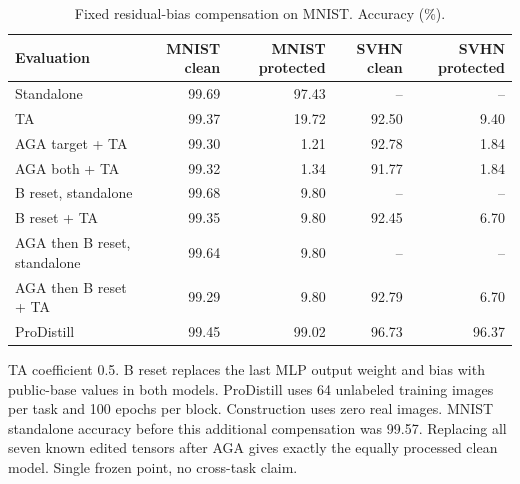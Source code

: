 \begin{table}[t]
\centering\small
\setlength{\tabcolsep}{4pt}
\caption{Fixed residual-bias compensation on MNIST. Accuracy (\%).}
\label{tab:evaluation}
\begin{tabular}{@{}lrrrr@{}}
\toprule
Evaluation & MNIST clean & MNIST protected & SVHN clean & SVHN protected \\
\midrule
Standalone & 99.69 & 97.43 & -- & -- \\
\midrule
TA & 99.37 & 19.72 & 92.50 & 9.40 \\
\midrule
AGA target + TA & 99.30 & 1.21 & 92.78 & 1.84 \\
\midrule
AGA both + TA & 99.32 & 1.34 & 91.77 & 1.84 \\
\midrule
B reset, standalone & 99.68 & 9.80 & -- & -- \\
\midrule
B reset + TA & 99.35 & 9.80 & 92.45 & 6.70 \\
\midrule
AGA then B reset, standalone & 99.64 & 9.80 & -- & -- \\
\midrule
AGA then B reset + TA & 99.29 & 9.80 & 92.79 & 6.70 \\
\midrule
ProDistill & 99.45 & 99.02 & 96.73 & 96.37 \\
\bottomrule
\end{tabular}
\par\smallskip
\begin{minipage}{\textwidth}\footnotesize TA coefficient 0.5. B reset replaces the last MLP output weight and bias with public-base values in both models. ProDistill uses 64 unlabeled training images per task and 100 epochs per block. Construction uses zero real images. MNIST standalone accuracy before this additional compensation was 99.57. Replacing all seven known edited tensors after AGA gives exactly the equally processed clean model. Single frozen point, no cross-task claim.\end{minipage}
\end{table}

